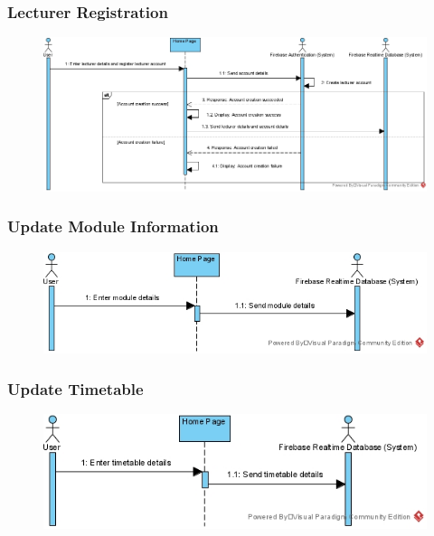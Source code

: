 \documentclass[../report.tex]{subfiles}
\begin{document}
\subsubsection{Lecturer Registration}
\begin{figure}[H]
\centering
\includegraphics[width=\textwidth]{./images/05-07-web-lec-reg.png}
\label{fig:web-lec-seq}
\end{figure}

\subsubsection{Update Module Information}
\begin{figure}[H]
\centering
\includegraphics[width=\textwidth]{./images/05-07-web-module.png}
\label{fig:web-module-seq}
\end{figure}

\subsubsection{Update Timetable}
\begin{figure}[H]
\centering
\includegraphics[width=\textwidth]{./images/05-07-web-timetable.png}
\label{fig:web-timetable-seq}
\end{figure}
\end{document}
